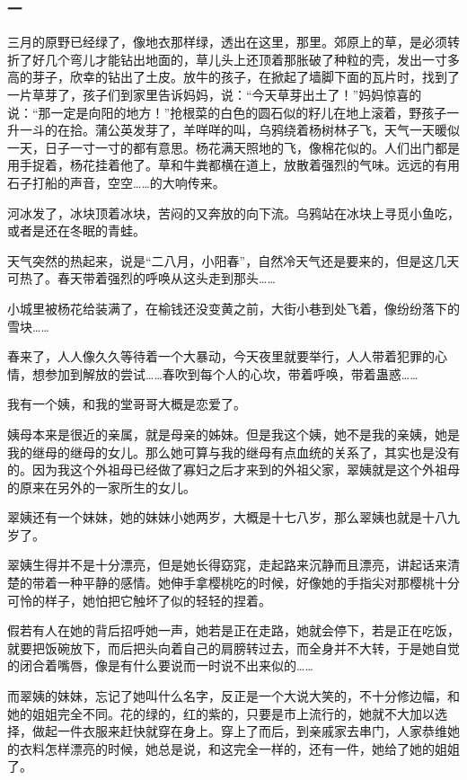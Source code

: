 \subsubsection*{一}
\par 三月的原野已经绿了，像地衣那样绿，透出在这里，那里。郊原上的草，是必须转折了好几个弯儿才能钻出地面的，草儿头上还顶着那胀破了种粒的壳，发出一寸多高的芽子，欣幸的钻出了土皮。放牛的孩子，在掀起了墙脚下面的瓦片时，找到了一片草芽了，孩子们到家里告诉妈妈，说：“今天草芽出土了！”妈妈惊喜的说：“那一定是向阳的地方！”抢根菜的白色的圆石似的籽儿在地上滚着，野孩子一升一斗的在拾。蒲公英发芽了，羊咩咩的叫，乌鸦绕着杨树林子飞，天气一天暖似一天，日子一寸一寸的都有意思。杨花满天照地的飞，像棉花似的。人们出门都是用手捉着，杨花挂着他了。草和牛粪都横在道上，放散着强烈的气味。远远的有用石子打船的声音，空空……的大响传来。
\par 河冰发了，冰块顶着冰块，苦闷的又奔放的向下流。乌鸦站在冰块上寻觅小鱼吃，或者是还在冬眠的青蛙。
\par 天气突然的热起来，说是“二八月，小阳春”，自然冷天气还是要来的，但是这几天可热了。春天带着强烈的呼唤从这头走到那头……
\par 小城里被杨花给装满了，在榆钱还没变黄之前，大街小巷到处飞着，像纷纷落下的雪块……
\par 春来了，人人像久久等待着一个大暴动，今天夜里就要举行，人人带着犯罪的心情，想参加到解放的尝试……春吹到每个人的心坎，带着呼唤，带着蛊惑……
\par 我有一个姨，和我的堂哥哥大概是恋爱了。
\par 姨母本来是很近的亲属，就是母亲的姊妹。但是我这个姨，她不是我的亲姨，她是我的继母的继母的女儿。那么她可算与我的继母有点血统的关系了，其实也是没有的。因为我这个外祖母已经做了寡妇之后才来到的外祖父家，翠姨就是这个外祖母的原来在另外的一家所生的女儿。
\par 翠姨还有一个妹妹，她的妹妹小她两岁，大概是十七八岁，那么翠姨也就是十八九岁了。
\par 翠姨生得并不是十分漂亮，但是她长得窈窕，走起路来沉静而且漂亮，讲起话来清楚的带着一种平静的感情。她伸手拿樱桃吃的时候，好像她的手指尖对那樱桃十分可怜的样子，她怕把它触坏了似的轻轻的捏着。
\par 假若有人在她的背后招呼她一声，她若是正在走路，她就会停下，若是正在吃饭，就要把饭碗放下，而后把头向着自己的肩膀转过去，而全身并不大转，于是她自觉的闭合着嘴唇，像是有什么要说而一时说不出来似的……
\par 而翠姨的妹妹，忘记了她叫什么名字，反正是一个大说大笑的，不十分修边幅，和她的姐姐完全不同。花的绿的，红的紫的，只要是市上流行的，她就不大加以选择，做起一件衣服来赶快就穿在身上。穿上了而后，到亲戚家去串门，人家恭维她的衣料怎样漂亮的时候，她总是说，和这完全一样的，还有一件，她给了她的姐姐了。
